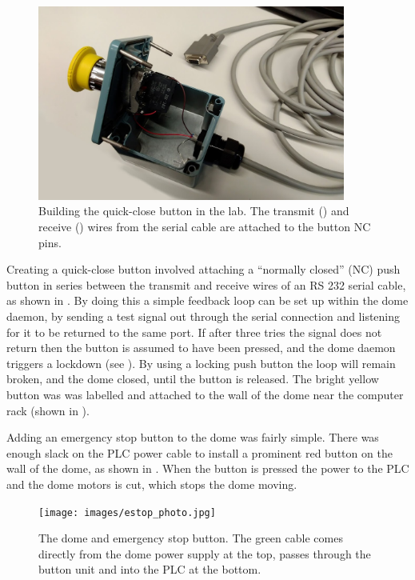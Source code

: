 \begin{colsection}
\begin{colsection}
\begin{figure}[t]
    \begin{center}
        \includegraphics[width=0.9\textwidth]{images/button_photo.jpg}
    \end{center}
    \caption[Building the quick-close button]{
        Building the quick-close button in the lab. The transmit () and receive () wires from the serial cable are attached to the button NC pins.
    }\label{fig:quickclose_button}
\end{figure}

Creating a quick-close button involved attaching a ``normally closed'' (NC) push button in series between the transmit and receive wires of an RS 232 serial cable, as shown in . By doing this a simple feedback loop can be set up within the dome daemon, by sending a test signal out through the serial connection and listening for it to be returned to the same port. If after three tries the signal does not return then the button is assumed to have been pressed, and the dome daemon triggers a lockdown (see ). By using a locking push button the loop will remain broken, and the dome closed, until the button is released. The bright yellow button was was labelled and attached to the wall of the dome near the computer rack (shown in ).

Adding an emergency stop button to the dome was fairly simple. There was enough slack on the PLC power cable to install a prominent red button on the wall of the dome, as shown in . When the button is pressed the power to the PLC and the dome motors is cut, which stops the dome moving.

\begin{figure}[p]
    \begin{center}
        \texttt{[image: images/estop\_photo.jpg]}
    \end{center}
    \caption[The dome PLC and emergency stop button]{
        The dome  and emergency stop button. The green cable comes directly from the dome power supply at the top, passes through the button unit and into the PLC at the bottom.
    }\label{fig:estop_plc}
\end{figure}


\end{colsection}
\end{colsection}
